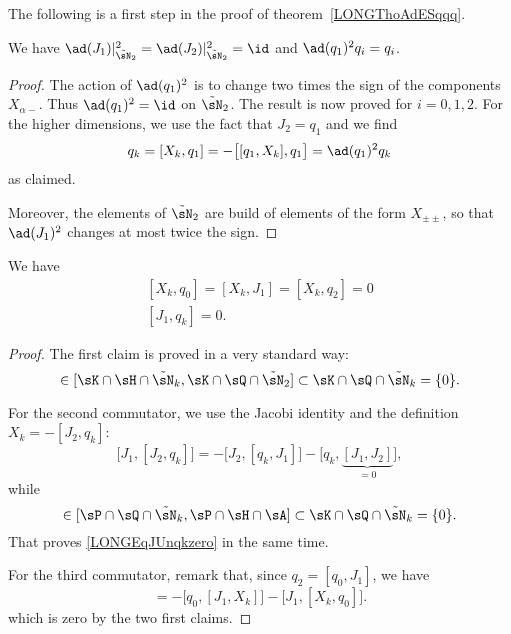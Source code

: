 The following is a first step in the proof of theorem~\ref{LONGThoAdESqqq}.
\begin{corollary}			\label{LONGCorAdQUncarreqi}
	We have $\ad(J_1)|_{\tilde\sN_2}^2=\ad(J_2)|_{\tilde\sN_2}^2=\id$ and $\ad(q_1)^2q_i=q_i$.
\end{corollary}

\begin{proof}
	The action of $\ad(q_1)^2$ is to change two times the sign of the components $X_{\alpha -}$. Thus $\ad(q_1)^2=\id$ on $\tilde\sN_2$. The result is now proved for $i=0,1,2$. For the higher dimensions, we use the fact that $J_2=q_1$ and we find
	\begin{equation}
		q_k=[X_k,q_1]=-\big[ [q_1,X_k],q_1 \big]=\ad(q_1)^2q_k
	\end{equation}
	as claimed.

	Moreover, the elements of $\tilde\sN_2$ are build of elements of the form $X_{\pm\pm}$, so that $\ad(J_1)^2$ changes at most twice the sign.

\end{proof}

\begin{lemma}		\label{LONGLemXkqzerozero}\label{LONGLemXkJunzero}
	We have
	\begin{subequations}
		\begin{align}
			[X_k,q_0]=[X_k,J_1]=[X_k,q_2]=0 \\
			[J_1,q_k]=0.		\label{LONGEqJUnqkzero}
		\end{align}
	\end{subequations}
\end{lemma}

\begin{proof}
	The first claim is proved in a very standard way:
	\begin{equation}
		[X_k,q_0]\in[\sK\cap\sH\cap\tilde\sN_k,\sK\cap\sQ\cap\tilde\sN_2]\subset\sK\cap\sQ\cap\tilde\sN_k=\{ 0 \}.
	\end{equation}

	For the second commutator, we use the Jacobi identity and the definition $X_k=-[J_2,q_k]$:
	\begin{equation}		\label{LONGEqJ1J2qkzero}
		\big[ J_1,[J_2,q_k] \big]=-\big[ J_2,[q_k,J_1] \big]-\big[ q_k,\underbrace{[J_1,J_2]}_{=0} \big],
	\end{equation}
	while
	\begin{equation}
		[q_k,J_1]\in[\sP\cap\sQ\cap\tilde\sN_k,\sP\cap\sH\cap\sA]\subset\sK\cap\sQ\cap\tilde\sN_k=\{ 0 \}.
	\end{equation}
	That proves \eqref{LONGEqJUnqkzero} in the same time.

	For the third commutator, remark that, since $q_2=[q_0,J_1]$, we have
	\begin{equation}
		[X_k,q_2]=-\big[ q_0,[J_1,X_k] \big]-\big[ J_1,[X_k,q_0] \big].
	\end{equation}
	which is zero by the two first claims.
\end{proof}

